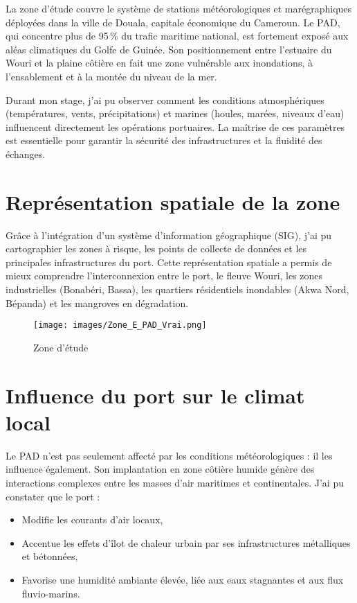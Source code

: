 \documentclass[a4paper,12pt,openany]{report}
\begin{document}
La zone d’étude couvre le système de stations météorologiques et marégraphiques déployées dans la ville de Douala, capitale économique du Cameroun. Le PAD, qui concentre plus de 95\,\% du trafic maritime national, est fortement exposé aux aléas climatiques du Golfe de Guinée. Son positionnement entre l’estuaire du Wouri et la plaine côtière en fait une zone vulnérable aux inondations, à l’ensablement et à la montée du niveau de la mer.

Durant mon stage, j’ai pu observer comment les conditions atmosphériques (températures, vents, précipitations) et marines (houles, marées, niveaux d’eau) influencent directement les opérations portuaires. La maîtrise de ces paramètres est essentielle pour garantir la sécurité des infrastructures et la fluidité des échanges.

\section{Représentation spatiale de la zone}

Grâce à l’intégration d’un système d’information géographique (SIG), j’ai pu cartographier les zones à risque, les points de collecte de données et les principales infrastructures du port. Cette représentation spatiale a permis de mieux comprendre l’interconnexion entre le port, le fleuve Wouri, les zones industrielles (Bonabéri, Bassa), les quartiers résidentiels inondables (Akwa Nord, Bépanda) et les mangroves en dégradation.

\begin{figure}[H]
	\centering
	\texttt{[image: images/Zone\_E\_PAD\_Vrai.png]}
	\caption{Zone d'étude \label{Fig 2.1}}
\end{figure}

\section{Influence du port sur le climat local}

Le PAD n’est pas seulement affecté par les conditions météorologiques : il les influence également. Son implantation en zone côtière humide génère des interactions complexes entre les masses d’air maritimes et continentales. J’ai pu constater que le port :
\begin{itemize}
	\item Modifie les courants d’air locaux,
	\item Accentue les effets d’îlot de chaleur urbain par ses infrastructures métalliques et bétonnées,
	\item Favorise une humidité ambiante élevée, liée aux eaux stagnantes et aux flux fluvio-marins.
\end{itemize}
\end{document}
